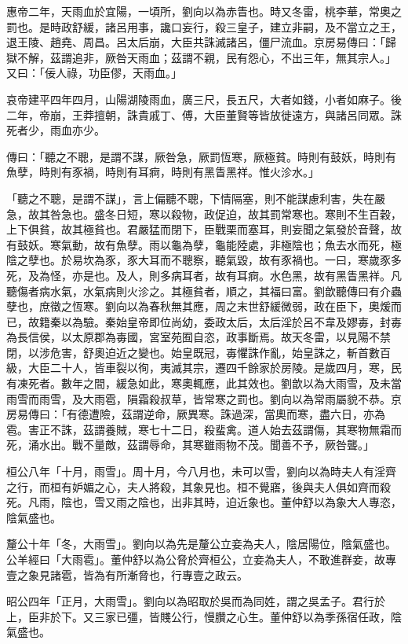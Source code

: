 \begin{pinyinscope}
惠帝二年，天雨血於宜陽，一頃所，劉向以為赤眚也。時又冬雷，桃李華，常奧之罰也。是時政舒緩，諸呂用事，讒口妄行，殺三皇子，建立非嗣，及不當立之王，退王陵、趙堯、周昌。呂太后崩，大臣共誅滅諸呂，僵尸流血。京房易傳曰：「歸獄不解，茲謂追非，厥咎天雨血；茲謂不親，民有怨心，不出三年，無其宗人。」又曰：「佞人祿，功臣僇，天雨血。」

哀帝建平四年四月，山陽湖陵雨血，廣三尺，長五尺，大者如錢，小者如麻子。後二年，帝崩，王莽擅朝，誅貴戚丁、傅，大臣董賢等皆放徙遠方，與諸呂同眾。誅死者少，雨血亦少。

傳曰：「聽之不聰，是謂不謀，厥咎急，厥罰恆寒，厥極貧。時則有鼓妖，時則有魚孽，時則有豕禍，時則有耳痾，時則有黑眚黑祥。惟火沴水。」

「聽之不聰，是謂不謀」，言上偏聽不聰，下情隔塞，則不能謀慮利害，失在嚴急，故其咎急也。盛冬日短，寒以殺物，政促迫，故其罰常寒也。寒則不生百穀，上下俱貧，故其極貧也。君嚴猛而閉下，臣戰栗而塞耳，則妄聞之氣發於音聲，故有鼓妖。寒氣動，故有魚孽。雨以龜為孽，龜能陸處，非極陰也；魚去水而死，極陰之孽也。於易坎為豕，豕大耳而不聰察，聽氣毀，故有豕禍也。一曰，寒歲豕多死，及為怪，亦是也。及人，則多病耳者，故有耳痾。水色黑，故有黑眚黑祥。凡聽傷者病水氣，水氣病則火沴之。其極貧者，順之，其福曰富。劉歆聽傳曰有介蟲孽也，庶徵之恆寒。劉向以為春秋無其應，周之末世舒緩微弱，政在臣下，奧煖而已，故籍秦以為驗。秦始皇帝即位尚幼，委政太后，太后淫於呂不韋及嫪毐，封毐為長信侯，以太原郡為毐國，宮室苑囿自恣，政事斷焉。故天冬雷，以見陽不禁閉，以涉危害，舒奧迫近之變也。始皇既冠，毐懼誅作亂，始皇誅之，斬首數百級，大臣二十人，皆車裂以徇，夷滅其宗，遷四千餘家於房陵。是歲四月，寒，民有凍死者。數年之間，緩急如此，寒奧輒應，此其效也。劉歆以為大雨雪，及未當雨雪而雨雪，及大雨雹，隕霜殺叔草，皆常寒之罰也。劉向以為常雨屬貌不恭。京房易傳曰：「有德遭險，茲謂逆命，厥異寒。誅過深，當奧而寒，盡六日，亦為雹。害正不誅，茲謂養賊，寒七十二日，殺蜚禽。道人始去茲謂傷，其寒物無霜而死，涌水出。戰不量敵，茲謂辱命，其寒雖雨物不茂。聞善不予，厥咎聾。」

桓公八年「十月，雨雪」。周十月，今八月也，未可以雪，劉向以為時夫人有淫齊之行，而桓有妒媚之心，夫人將殺，其象見也。桓不覺寤，後與夫人俱如齊而殺死。凡雨，陰也，雪又雨之陰也，出非其時，迫近象也。董仲舒以為象大人專恣，陰氣盛也。

釐公十年「冬，大雨雪」。劉向以為先是釐公立妾為夫人，陰居陽位，陰氣盛也。公羊經曰「大雨雹」。董仲舒以為公脅於齊桓公，立妾為夫人，不敢進群妾，故專壹之象見諸雹，皆為有所漸脅也，行專壹之政云。

昭公四年「正月，大雨雪」。劉向以為昭取於吳而為同姓，謂之吳孟子。君行於上，臣非於下。又三家已彊，皆賤公行，慢臢之心生。董仲舒以為季孫宿任政，陰氣盛也。


\end{pinyinscope}
